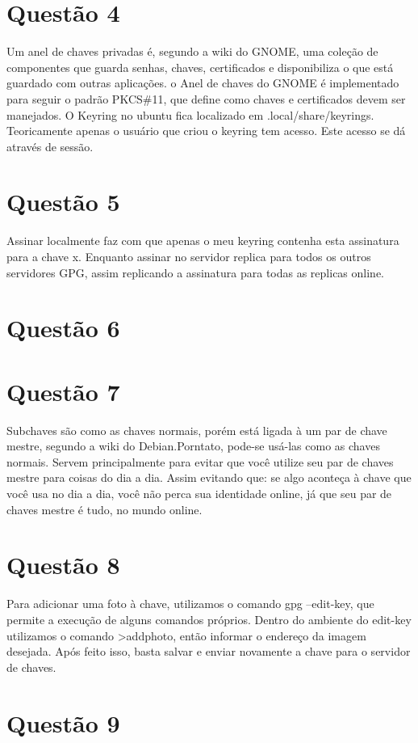 \documentclass[openany]{ufsctex/ufsctex}
\begin{document}
\section{Questão 4}
	Um anel de chaves privadas é, segundo a wiki do GNOME, uma coleção de componentes que guarda senhas, chaves, certificados e disponibiliza o que está guardado com outras aplicações. o Anel de chaves do GNOME é implementado para seguir o padrão PKCS\#11, que define como chaves e certificados devem ser manejados. O Keyring no ubuntu fica localizado em .local/share/keyrings. Teoricamente apenas o usuário que criou o keyring tem acesso. Este acesso se dá através de sessão.
	
\section{Questão 5}
	Assinar localmente faz com que apenas o meu keyring contenha esta assinatura para a chave x. Enquanto assinar no servidor replica para todos os outros servidores GPG, assim replicando a assinatura para todas as replicas online.

\section{Questão 6}
	
	
\section{Questão 7}
	Subchaves são como as chaves normais, porém está ligada à um par de chave mestre, segundo a wiki do Debian.Porntato, pode-se usá-las como as chaves normais. Servem principalmente para evitar que você utilize seu par de chaves mestre para coisas do dia a dia. Assim evitando que: se algo aconteça à chave que você usa no dia a dia, você não perca sua identidade online, já que seu par de chaves mestre é tudo, no mundo online.
	
\section{Questão 8}
	Para adicionar uma foto à chave, utilizamos o comando gpg --edit-key, que permite a execução de alguns comandos próprios. Dentro do ambiente do edit-key utilizamos o comando >addphoto, então informar o endereço da imagem desejada. Após feito isso, basta salvar e enviar novamente a chave para o servidor de chaves.
	
\section{Questão 9}
	
\end{document}
